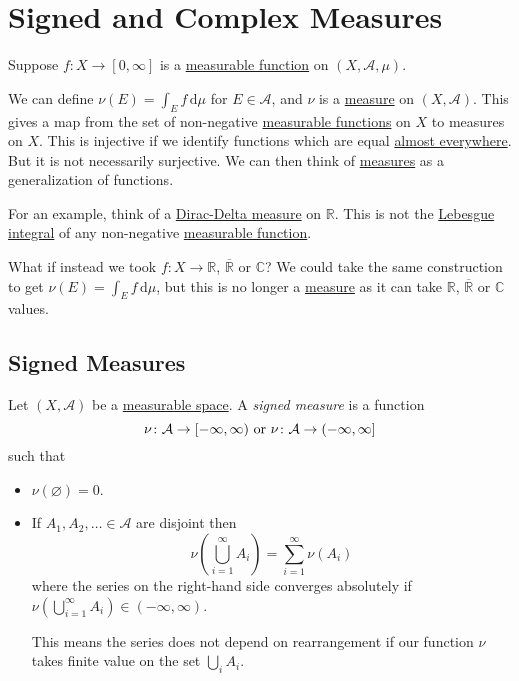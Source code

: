 \chapter{Signed and Complex Measures}\label{ch:Signed-and-Complex-Measures}
\begin{prev}
	Suppose \(f \colon X \to [0,\infty]\) is a \hyperref[def:measurable-function]{measurable function} on \((X, \mathcal{A}, \mu)\).

	We can define \(\nu(E) = \int_E f \,\mathrm{d} \mu\)  for \(E \in \mathcal{A}\), and \(\nu\) is a \hyperref[def:measure]{measure} on \((X, \mathcal{A})\).
	This gives a map from the set of non-negative \hyperref[def:measurable-function]{measurable functions} on \(X\) to measures on \(X\). This is
	injective if we identify functions which are equal \hyperref[def:mu-almost-everywhere]{almost everywhere}. But it is not necessarily surjective.
	We can then think of \hyperref[def:measure]{measures} as a generalization of functions.

	For an example, think of a \hyperref[eg:Dirac-Delta measure]{Dirac-Delta measure} on \(\mathbb{R}\). This is not the \hyperref[def:integrable]{Lebesgue integral}
	of any non-negative \hyperref[def:measurable-function]{measurable function}.
\end{prev}

\hr

What if instead we took \(f \colon X \to \mathbb{R}\), \(\overline{\mathbb{R}}\) or \(\mathbb{C}\)? We could take the same construction to get
\(\nu(E) = \int_E f \,\mathrm{d} \mu\), but this is no longer a \hyperref[def:measure]{measure} as it can take \(\mathbb{R}\), \(\overline{\mathbb{R}}\) or \(\mathbb{C}\) values.

\section{Signed Measures}
\begin{definition}\label{def:signed-measure}
	Let \((X, \mathcal{A})\) be a \hyperref[def:measurable-space]{measurable space}. A \emph{signed measure} is a function
	\[
		\nu \colon \mathcal{A} \to [-\infty,\infty)\text{ or } \nu \colon \mathcal{\MakeUppercase{a}} \to  (-\infty, \infty]
	\]
	such that
	\begin{itemize}
		\item \(\nu(\varnothing ) = 0\).
		\item If \(A_1,A_2,\ldots \in \mathcal{A}\) are disjoint then
		      \[
			      \nu\left( \bigcup_{i=1}^\infty A_i \right) = \sum_{i=1}^\infty \nu(A_i)
		      \]
		      where the series on the right-hand side converges absolutely if \(\nu\left( \bigcup_{i=1}^\infty A_{i} \right) \in (-\infty,\infty)\).
		      \begin{remark}
			      This means the series does not depend on rearrangement if our function \(\nu \) takes finite value on the set \(\bigcup_i A_{i} \).
		      \end{remark}
	\end{itemize}
\end{definition}

